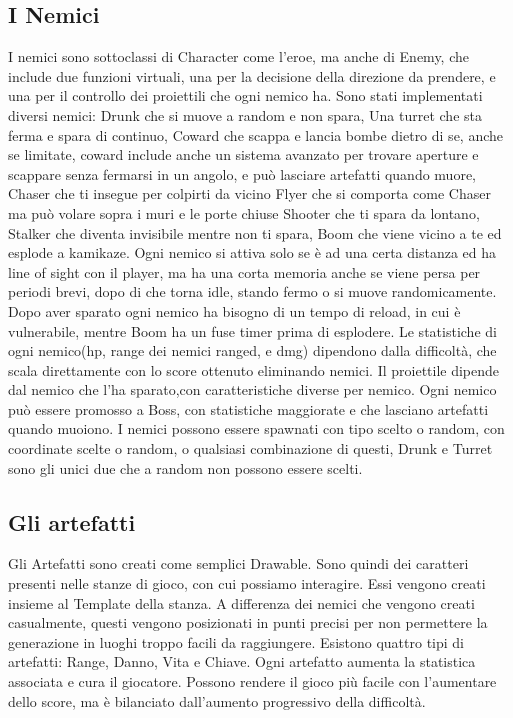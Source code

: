 \documentclass[12pt]{article}
\begin{document}
\subsection{I Nemici}
I nemici sono sottoclassi di Character come l'eroe, ma anche di Enemy, che include due funzioni virtuali, una per la 
decisione della direzione da prendere, e una per il controllo dei proiettili che ogni nemico ha.
Sono stati implementati diversi nemici: \hfill\break
Drunk che si muove a random e non spara,\hfill\break
Una turret che sta ferma e spara di continuo, \hfill\break
Coward che scappa e lancia bombe dietro di se, anche se limitate, coward include anche un sistema avanzato per 
trovare aperture e scappare senza fermarsi in un angolo, e può lasciare artefatti quando muore,\hfill\break
Chaser che ti insegue per colpirti da vicino  \hfill\break
Flyer che si comporta come Chaser ma può volare sopra i muri e le porte chiuse  \hfill\break
Shooter che ti spara da lontano,  \hfill\break
Stalker che diventa invisibile mentre non ti spara,  \hfill\break
Boom che viene vicino a te ed esplode a kamikaze.  \hfill\break
\newline
Ogni nemico si attiva solo se è ad una certa distanza ed ha line of sight con il player, ma ha una corta memoria 
anche se viene persa per periodi brevi, dopo di che torna idle, stando fermo o si muove randomicamente.
Dopo aver sparato ogni nemico ha bisogno di un tempo di reload, in cui è vulnerabile, mentre Boom ha un fuse timer prima di esplodere.
Le statistiche di ogni nemico(hp, range dei nemici ranged, e dmg) dipendono dalla difficoltà, che scala direttamente
 con lo score ottenuto eliminando nemici.
Il proiettile dipende dal nemico che l'ha sparato,con caratteristiche diverse per nemico.
Ogni nemico può essere promosso a Boss, con statistiche maggiorate e che lasciano artefatti quando muoiono.
I nemici possono essere spawnati con tipo scelto o random, con coordinate scelte o random, o qualsiasi combinazione
 di questi, Drunk e Turret sono gli unici due che a random non possono essere scelti.



\subsection{Gli artefatti}
Gli Artefatti sono creati come semplici Drawable. Sono quindi dei caratteri presenti nelle stanze di gioco, con cui 
possiamo interagire. Essi vengono creati insieme al Template della stanza. A differenza dei nemici che vengono creati
 casualmente, questi vengono posizionati in punti precisi per non permettere la generazione in luoghi troppo facili da raggiungere.
Esistono quattro tipi di artefatti: Range, Danno, Vita e Chiave.
Ogni artefatto aumenta la statistica associata e cura il giocatore.
Possono rendere il gioco più facile con l'aumentare dello score, ma è bilanciato dall'aumento progressivo della difficoltà.
\end{document}
